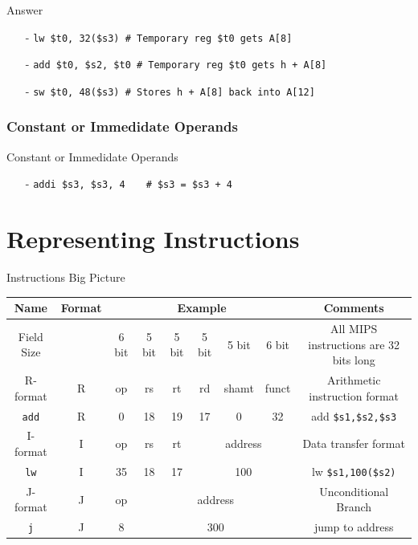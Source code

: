 \begin{frame}{Answer}
\begin{itemize}
\item[-]
\texttt{lw \$t0, 32(\$s3) \# Temporary reg \$t0 gets A[8]}

\item[-]
\texttt{add \$t0, \$s2, \$t0  \# Temporary reg \$t0 gets h + A[8]}

\item[-]
\texttt{sw \$t0, 48(\$s3)  \# Stores h + A[8] back into A[12]}
\end{itemize}    
\end{frame}

\subsubsection{Constant or Immedidate Operands}
\begin{frame}{Constant or Immedidate Operands}
\begin{itemize}
\item[-] \texttt{addi \$s3, \$s3, 4  $\, \, \, \, \,$ \# \$s3 = \$s3 + 4}
\end{itemize}
\end{frame}

\section{Representing Instructions}
\begin{frame}{Instructions Big Picture}
\begin{table}[H]
\begin{adjustbox}{width=\textwidth}
\begin{tabular}{|c|c|c|c|c|c|c|c|c|}
\hline
Name & Format & \multicolumn{6}{|c|}{Example} & Comments \\
\hline
\hline
Field Size && 6 bit & 5 bit & 5 bit & 5 bit & 5 bit & 6 bit & All MIPS instructions are 32 bits long \\
\hline
R-format & R & op & rs & rt & rd & shamt & funct & Arithmetic instruction format \\
\hline
\texttt{add} & R & 0 & 18 & 19 & 17 & 0 & 32 & add \texttt{\$s1,\$s2,\$s3} \\
\hline
I-format & I & op & rs & rt & \multicolumn{3}{|c|}{address} & Data transfer format\\
\hline
\texttt{lw} & I & 35 & 18 & 17 & \multicolumn{3}{|c|}{100} & lw \texttt{\$s1,100(\$s2)} \\
\hline
J-format & J & op & \multicolumn{5}{|c|}{address} & Unconditional Branch \\
\hline
\texttt{j} & J & 8 & \multicolumn{5}{|c|}{300} & jump to address \\
\hline
\end{tabular}
\end{adjustbox}
\end{table}
\end{frame}

